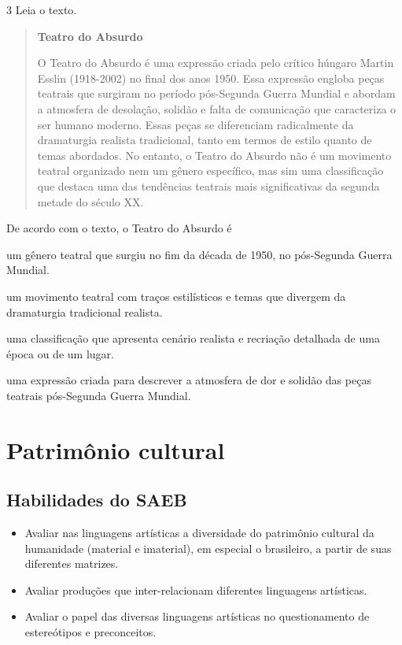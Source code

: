 \num{3} Leia o texto.

\begin{quote}
\textbf{Teatro do Absurdo}

O Teatro do Absurdo é uma expressão criada pelo crítico húngaro Martin Esslin (1918-2002) 
no final dos anos 1950. Essa expressão engloba peças teatrais que surgiram no período 
pós-Segunda Guerra Mundial e abordam a atmosfera de desolação, solidão e falta de comunicação 
que caracteriza o ser humano moderno. Essas peças se diferenciam radicalmente da dramaturgia 
realista tradicional, tanto em termos de estilo quanto de temas abordados. No entanto, o 
Teatro do Absurdo não é um movimento teatral organizado nem um gênero específico, mas sim uma 
classificação que destaca uma das tendências teatrais mais significativas da segunda metade 
do século XX.

\end{quote}

De acordo com o texto, o Teatro do Absurdo é

\begin{escolha}
\item
  um gênero teatral que surgiu no fim da década de 1950, no pós-Segunda
  Guerra Mundial.
\item
  um movimento teatral com traços estilísticos e temas que divergem da
  dramaturgia tradicional realista.
\item
  uma classificação que apresenta cenário realista e recriação detalhada
  de uma época ou de um lugar.
\item
  uma expressão criada para descrever a atmosfera de dor e solidão das
  peças teatrais pós-Segunda Guerra Mundial.
\end{escolha}


\chapter{Patrimônio cultural}

\section{Habilidades do SAEB}

\begin{itemize}
\item Avaliar nas linguagens artísticas a diversidade do patrimônio cultural
da humanidade (material e imaterial), em especial o brasileiro, a partir
de suas diferentes matrizes.
\item Avaliar produções que inter-relacionam diferentes linguagens
artísticas.
\item Avaliar o papel das diversas linguagens artísticas no questionamento
de estereótipos e preconceitos.
\end{itemize}

